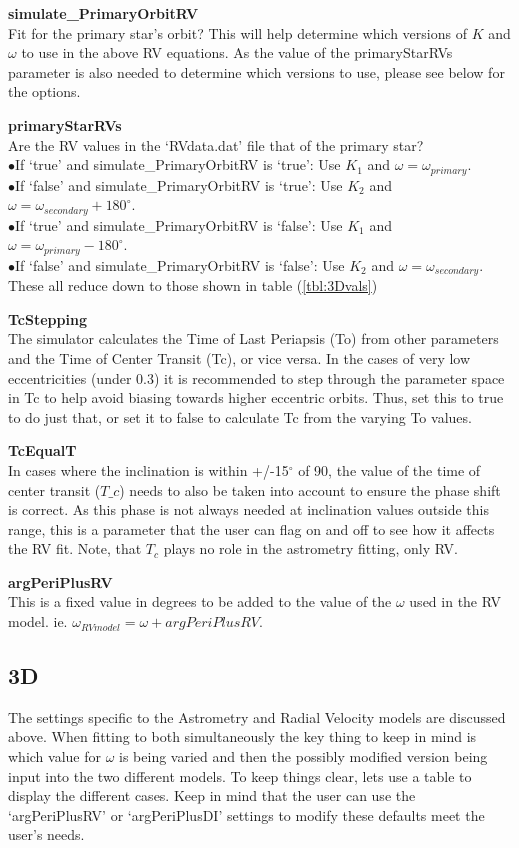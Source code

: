 \documentclass[12pt,preprint]{aastex}
\begin{document}
{\bf simulate\_PrimaryOrbitRV}\\
Fit for the primary star's orbit?  This will help determine which versions of $K$ and $\omega$ to use in the above RV equations.  As the value of the primaryStarRVs parameter is also needed to determine which versions to use, please see below for the options.

{\bf primaryStarRVs}\\
Are the RV values in the `RVdata.dat' file that of the primary star?  \\
$\bullet$If `true' and simulate\_PrimaryOrbitRV is `true': Use $K_1$ and $\omega = \omega_{primary}$.\\
$\bullet$If `false' and simulate\_PrimaryOrbitRV is `true': Use $K_2$ and $\omega = \omega_{secondary}+180^{\circ}.$\\
$\bullet$If `true' and simulate\_PrimaryOrbitRV is `false': Use $K_1$ and $\omega = \omega_{primary}-180^{\circ}$.\\
$\bullet$If `false' and simulate\_PrimaryOrbitRV is `false': Use $K_2$ and $\omega = \omega_{secondary}$.\\
These all reduce down to those shown in table (\ref{tbl:3Dvals})

{\bf TcStepping}\\
The simulator calculates the Time of Last Periapsis (To) from other parameters and the Time of Center Transit (Tc), or vice versa.  In the cases of very low eccentricities (under 0.3) it is recommended to step through the parameter space in Tc to help avoid biasing towards higher eccentric orbits.  Thus, set this to true to do just that, or set it to false to calculate Tc from the varying To values.

{\bf TcEqualT}\\
In cases where the inclination is within +/-15$^{\circ}$ of 90, the value of the time of center transit ($T\_c$) needs to also be taken into account to ensure the phase shift is correct.  As this phase is not always needed at inclination values outside this range, this is a parameter that the user can flag on and off to see how it affects the RV fit.  Note, that $T_c$ plays no role in the astrometry fitting, only RV.

{\bf argPeriPlusRV}\\
This is a fixed value in degrees to be added to the value of the $\omega$ used in the RV model. ie. $\omega_{RVmodel}=\omega+argPeriPlusRV$.
\subsection{3D}
The settings specific to the Astrometry and Radial Velocity models are discussed above.  When fitting to both simultaneously the key thing to keep in mind is which value for $\omega$ is being varied and then the possibly modified version being input into the two different models.  To keep things clear, lets use a table to display the different cases.  Keep in mind that the user can use the `argPeriPlusRV' or `argPeriPlusDI' settings to modify these defaults meet the user's needs.
\end{document}
